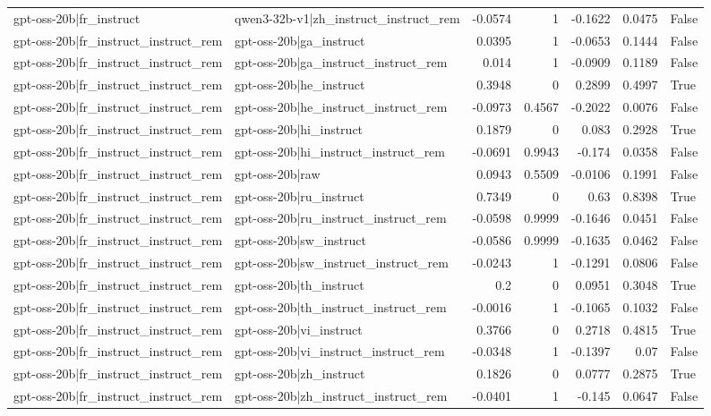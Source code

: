 \begin{table}
\begin{tabular}{l l r r r r l}
gpt-oss-20b|fr_instruct & qwen3-32b-v1|zh_instruct_instruct_rem & -0.0574 & 1 & -0.1622 & 0.0475 & False \\
gpt-oss-20b|fr_instruct_instruct_rem & gpt-oss-20b|ga_instruct & 0.0395 & 1 & -0.0653 & 0.1444 & False \\
gpt-oss-20b|fr_instruct_instruct_rem & gpt-oss-20b|ga_instruct_instruct_rem & 0.014 & 1 & -0.0909 & 0.1189 & False \\
gpt-oss-20b|fr_instruct_instruct_rem & gpt-oss-20b|he_instruct & 0.3948 & 0 & 0.2899 & 0.4997 & True \\
gpt-oss-20b|fr_instruct_instruct_rem & gpt-oss-20b|he_instruct_instruct_rem & -0.0973 & 0.4567 & -0.2022 & 0.0076 & False \\
gpt-oss-20b|fr_instruct_instruct_rem & gpt-oss-20b|hi_instruct & 0.1879 & 0 & 0.083 & 0.2928 & True \\
gpt-oss-20b|fr_instruct_instruct_rem & gpt-oss-20b|hi_instruct_instruct_rem & -0.0691 & 0.9943 & -0.174 & 0.0358 & False \\
gpt-oss-20b|fr_instruct_instruct_rem & gpt-oss-20b|raw & 0.0943 & 0.5509 & -0.0106 & 0.1991 & False \\
gpt-oss-20b|fr_instruct_instruct_rem & gpt-oss-20b|ru_instruct & 0.7349 & 0 & 0.63 & 0.8398 & True \\
gpt-oss-20b|fr_instruct_instruct_rem & gpt-oss-20b|ru_instruct_instruct_rem & -0.0598 & 0.9999 & -0.1646 & 0.0451 & False \\
gpt-oss-20b|fr_instruct_instruct_rem & gpt-oss-20b|sw_instruct & -0.0586 & 0.9999 & -0.1635 & 0.0462 & False \\
gpt-oss-20b|fr_instruct_instruct_rem & gpt-oss-20b|sw_instruct_instruct_rem & -0.0243 & 1 & -0.1291 & 0.0806 & False \\
gpt-oss-20b|fr_instruct_instruct_rem & gpt-oss-20b|th_instruct & 0.2 & 0 & 0.0951 & 0.3048 & True \\
gpt-oss-20b|fr_instruct_instruct_rem & gpt-oss-20b|th_instruct_instruct_rem & -0.0016 & 1 & -0.1065 & 0.1032 & False \\
gpt-oss-20b|fr_instruct_instruct_rem & gpt-oss-20b|vi_instruct & 0.3766 & 0 & 0.2718 & 0.4815 & True \\
gpt-oss-20b|fr_instruct_instruct_rem & gpt-oss-20b|vi_instruct_instruct_rem & -0.0348 & 1 & -0.1397 & 0.07 & False \\
gpt-oss-20b|fr_instruct_instruct_rem & gpt-oss-20b|zh_instruct & 0.1826 & 0 & 0.0777 & 0.2875 & True \\
gpt-oss-20b|fr_instruct_instruct_rem & gpt-oss-20b|zh_instruct_instruct_rem & -0.0401 & 1 & -0.145 & 0.0647 & False \\

\end{tabular}
\end{table}
